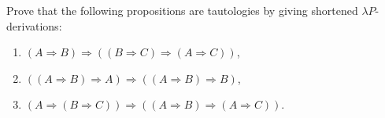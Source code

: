 \begin{problem}{5.7}
    Prove that the following propositions are tautologies by giving shortened $\lambda P$-derivations:
    \begin{enumerate}[label=$(\alph*)$]
    \item $(A \Rightarrow B) \Rightarrow ((B \Rightarrow C) \Rightarrow (A \Rightarrow C))$,
    \item $((A \Rightarrow B) \Rightarrow A) \Rightarrow ((A \Rightarrow B) \Rightarrow B)$,
    \item $(A \Rightarrow (B \Rightarrow C)) \Rightarrow ((A \Rightarrow B) \Rightarrow (A \Rightarrow C))$.
    \end{enumerate} 
\end{problem}